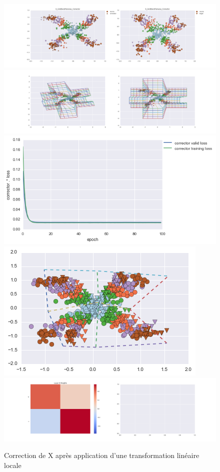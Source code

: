 \begin{figure}[H] %
\centering
\includegraphics[width=\linewidth]{fig/24-05-2016/X/X_GridBendPairwise_Corrector-DATA.png}
\includegraphics[width=\linewidth]{fig/24-05-2016/X/X_GridBendPairwise_Corrector-GridCheck.png}
\includegraphics[width=0.45\linewidth]{fig/24-05-2016/X/X_GridBendPairwise_Corrector-Learning_curve.png}
\includegraphics[width=0.45\linewidth]{fig/24-05-2016/X/X_grid.png}
\includegraphics[width=\linewidth]{fig/24-05-2016/X/X_GridBendPairwise_Corrector-W.png}
\caption{Correction de X après application d'une transformation linéaire locale}
\label{fig:recap-X-GridBend-pairwise}
\end{figure}

